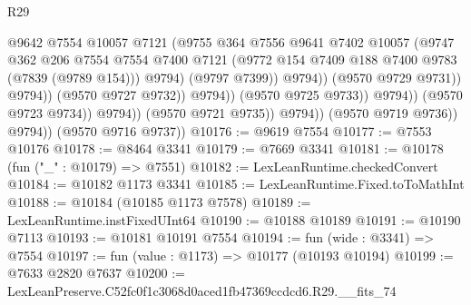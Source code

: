 \begin{lexlean}{R29}
\begin{coremodule}
                                              @9642
                                              @7554
                                              @10057
                                              @7121
                                              (@9755
                                                @364
                                                @7556
                                                @9641
                                                @7402
                                                @10057
                                                (@9747
                                                  @362
                                                  @206
                                                  @7554
                                                  @7554
                                                  @7400
                                                  @7121
                                                  (@9772
                                                    @154
                                                    @7409
                                                    @188
                                                    @7400
                                                    @9783
                                                    (@7839 (@9789 @154)))
                                                  @9794)
                                                (@9797 @7399))
                                              @9794))
                                          (@9570 @9729 @9731))
                                        @9794))
                                    (@9570 @9727 @9732))
                                  @9794))
                              (@9570 @9725 @9733))
                            @9794))
                        (@9570 @9723 @9734))
                      @9794))
                  (@9570 @9721 @9735))
                @9794))
            (@9570 @9719 @9736))
          @9794))
      (@9570 @9716 @9737))
@10176 := @9619 @7554
@10177 := @7553 @10176
@10178 := @8464 @3341
@10179 := @7669 @3341
@10181 := @10178 (fun ("_" : @10179) => @7551)
@10182 := LexLeanRuntime.checkedConvert
@10184 := @10182 @1173 @3341
@10185 := LexLeanRuntime.Fixed.toToMathInt
@10188 := @10184 (@10185 @1173 @7578)
@10189 := LexLeanRuntime.instFixedUInt64
@10190 := @10188 @10189
@10191 := @10190 @7113
@10193 := @10181 @10191 @7554
@10194 := fun (wide : @3341) => @7554
@10197 := fun (value : @1173) => @10177 (@10193 @10194)
@10199 := @7633 @2820 @7637
@10200 := LexLeanPreserve.C52fc0f1c3068d0aced1fb47369ccdcd6.R29.__fits_74

\end{coremodule}
\end{lexlean}
